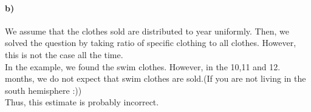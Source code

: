\documentclass[a4paper,12pt]{article}
\begin{document}
\paragraph{b)}

\begin{tcolorbox}
We assume that the clothes sold are distributed to year uniformly. Then, we solved the question by taking ratio of specific clothing to all clothes. However, this is not the case all the time.\\
In the example, we found the swim clothes. However, in the 10,11 and 12. months, we do not expect that swim clothes are sold.(If you are not living in the south hemisphere :))\\
Thus, this estimate is probably incorrect.
\end{tcolorbox}
\end{document}
